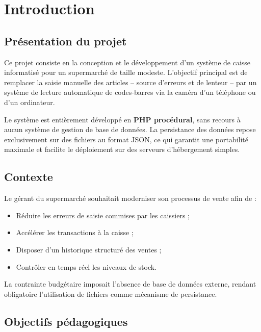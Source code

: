 \documentclass[12pt,a4paper]{report}
\begin{document}
\chapter{Introduction}

\section{Présentation du projet}

Ce projet consiste en la conception et le développement d'un système de caisse
informatisé pour un supermarché de taille modeste. L'objectif principal est de
remplacer la saisie manuelle des articles -- source d'erreurs et de lenteur -- par
un système de lecture automatique de codes-barres via la caméra d'un téléphone ou
d'un ordinateur.

Le système est entièrement développé en \textbf{PHP procédural}, sans recours à
aucun système de gestion de base de données. La persistance des données repose
exclusivement sur des fichiers au format JSON, ce qui garantit une portabilité
maximale et facilite le déploiement sur des serveurs d'hébergement simples.

\section{Contexte}

Le gérant du supermarché souhaitait moderniser son processus de vente afin de :
\begin{itemize}
  \item Réduire les erreurs de saisie commises par les caissiers ;
  \item Accélérer les transactions à la caisse ;
  \item Disposer d'un historique structuré des ventes ;
  \item Contrôler en temps réel les niveaux de stock.
\end{itemize}

La contrainte budgétaire imposait l'absence de base de données externe, rendant
obligatoire l'utilisation de fichiers comme mécanisme de persistance.

\section{Objectifs pédagogiques}
\end{document}

